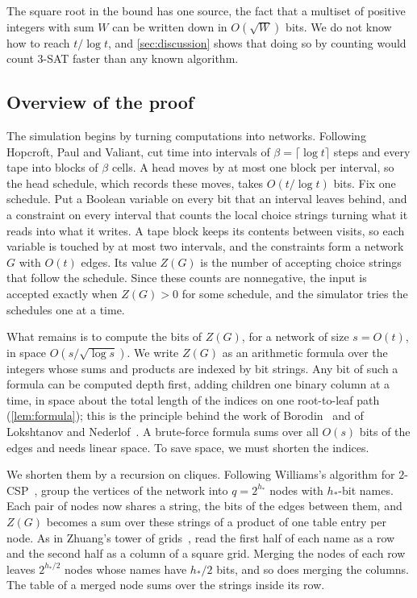 \documentclass[11pt]{article}
\theoremstyle{definition}
\theoremstyle{definition}
\theoremstyle{remark}
\begin{document}
The square root in the bound has one source, the fact that a multiset of positive integers with sum $W$ can be written down in $O(\sqrt W)$ bits. We do not know how to reach $t/\log t$, and \cref{sec:discussion} shows that doing so by counting would count $3$-SAT faster than any known algorithm.

\subsection{Overview of the proof}\label{sec:overview}

The simulation begins by turning computations into networks. Following Hopcroft, Paul and Valiant, cut time into intervals of $\beta=\lceil\log t\rceil$ steps and every tape into blocks of $\beta$ cells. A head moves by at most one block per interval, so the head schedule, which records these moves, takes $O(t/\log t)$ bits. Fix one schedule. Put a Boolean variable on every bit that an interval leaves behind, and a constraint on every interval that counts the local choice strings turning what it reads into what it writes. A tape block keeps its contents between visits, so each variable is touched by at most two intervals, and the constraints form a network $G$ with $O(t)$ edges. Its value $Z(G)$ is the number of accepting choice strings that follow the schedule. Since these counts are nonnegative, the input is accepted exactly when $Z(G)>0$ for some schedule, and the simulator tries the schedules one at a time.

What remains is to compute the bits of $Z(G)$, for a network of size $s=O(t)$, in space $O(s/\sqrt{\log s})$. We write $Z(G)$ as an arithmetic formula over the integers whose sums and products are indexed by bit strings. Any bit of such a formula can be computed depth first, adding children one binary column at a time, in space about the total length of the indices on one root-to-leaf path (\cref{lem:formula}); this is the principle behind the work of Borodin~\cite{Bor77} and of Lokshtanov and Nederlof~\cite{LN10}. A brute-force formula sums over all $O(s)$ bits of the edges and needs linear space. To save space, we must shorten the indices.

We shorten them by a recursion on cliques. Following Williams's algorithm for $2$-CSP~\cite{Wil05}, group the vertices of the network into $q=2^{h_*}$ nodes with $h_*$-bit names. Each pair of nodes now shares a string, the bits of the edges between them, and $Z(G)$ becomes a sum over these strings of a product of one table entry per node. As in Zhuang's tower of grids~\cite{Zhu26}, read the first half of each name as a row and the second half as a column of a square grid. Merging the nodes of each row leaves $2^{h_*/2}$ nodes whose names have $h_*/2$ bits, and so does merging the columns. The table of a merged node sums over the strings inside its row.
\end{document}
